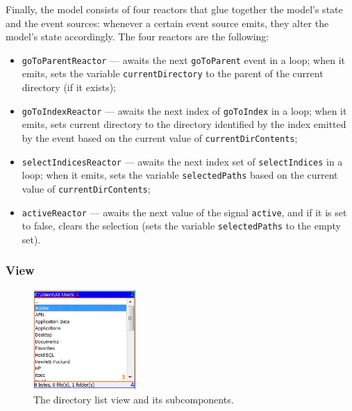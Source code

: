 Finally, the model consists of four reactors that glue together the model's state and the event sources: whenever a certain event source emits, they alter the model's state accordingly. The four reactors are the following:
\begin{itemize}
\item \texttt{goToParentReactor} --- awaits the next \texttt{goToParent} event in a loop; when it emits, sets the variable \texttt{currentDirectory} to the parent of the current directory (if it exists);
\item \texttt{goToIndexReactor} --- awaits the next index of \texttt{goToIndex} in a loop; when it emits, sets current directory to the directory identified by the index emitted by the event based on the current value of \texttt{currentDirContents};
\item \texttt{selectIndicesReactor} --- awaits the next index set of \texttt{selectIndices} in a loop; when it emits, sets the variable \texttt{selectedPaths} based on the current value of \texttt{currentDirContents};
\item \texttt{activeReactor} --- awaits the next value of the signal \texttt{active}, and if it is set to false, clears the selection (sets the variable \texttt{selectedPaths} to the empty set).
\end{itemize}

\subsubsection{View}

\begin{figure}
  \centering
    \includegraphics[width=0.35\textwidth]{images/scala-commander-directoryListView.png}
  \caption{The directory list view and its subcomponents.}
  \label{fig:scomm_main}  
\end{figure}

